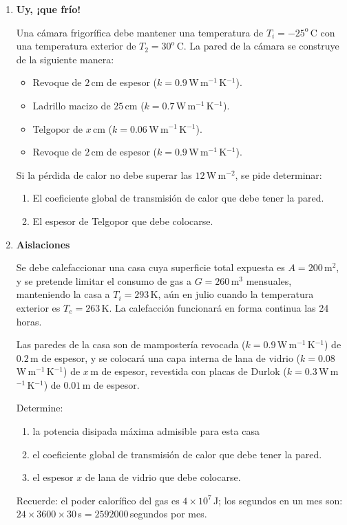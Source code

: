 \documentclass[a4paper,12pt]{article}
\begin{document}
\begin{enumerate}
\item {\bf{Uy, ¡que frío!}}

Una cámara frigorífica debe mantener una temperatura de $T_i=-25^\mathrm{o}$\,C
con una temperatura exterior de $T_2=30^\mathrm{o}$\,C. La pared de la cámara
se construye de la siguiente manera:
\begin{itemize}
\item Revoque de $2$\,cm de espesor
($k=0.9$\,W\,m$^{-1}$\,K$^{-1}$).
\item Ladrillo macizo de $25$\,cm
($k=0.7$\,W\,m$^{-1}$\,K$^{-1}$).
\item Telgopor de $x$\,cm ($k=0.06$\,W\,m$^{-1}$\,K$^{-1}$).
\item Revoque de $2$\,cm de espesor
($k=0.9$\,W\,m$^{-1}$\,K$^{-1}$).
\end{itemize}
Si la pérdida de calor no debe superar las $12$\,W\,m$^{-2}$, se
pide determinar:
\begin{enumerate}
\item El coeficiente global de transmisión de calor que debe tener la pared.
\item El espesor de Telgopor que debe colocarse.
\end{enumerate}

\item {\bf{Aislaciones}}

Se debe calefaccionar una casa cuya superficie total expuesta es
$A=200$\,m$^2$, y se pretende limitar el consumo de gas a $G=260$\,m$^3$
mensuales, manteniendo la casa a $T_i=293$\,K, aún en julio cuando la
temperatura exterior es $T_e=263$\,K. La calefacción funcionará en forma continua las 24 horas.

Las paredes de la casa son de mampostería revocada
($k=0.9$\,W\,m$^{-1}$\,K$^{-1}$) de $0.2$\,m de espesor, y se colocará una capa
interna de lana de vidrio ($k=0.08$\,W\,m$^{-1}$\,K$^{-1}$) de $x$\,m de
espesor, revestida con placas de Durlok ($k=0.3$\,W\,m$^{-1}$\,K$^{-1}$) de
$0.01$\,m de espesor.

Determine:

\begin{enumerate}
\item la potencia disipada máxima admisible para esta casa
\item el coeficiente global de transmisión de calor que debe
tener la pared.
\item el espesor $x$ de lana de vidrio que debe colocarse.
\end{enumerate}

Recuerde: el poder calorífico del gas es $4\times 10^7$\,J; los segundos en un mes son:$24\times3600\times30$\,s$=2592000$\,segundos por mes.

\end{enumerate}
\end{document}

